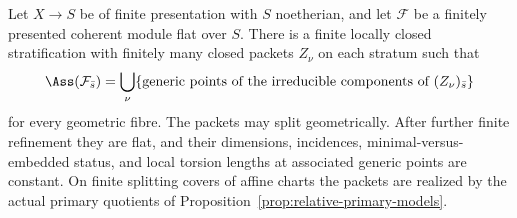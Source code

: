 

\begin{lemma}
\label{lem:finite-geometric-assassin-stratification}
Let \(X\to S\) be of finite presentation with \(S\) noetherian,
and let \(\mathcal F\) be a finitely presented coherent module flat
over \(S\).  There is a finite locally closed stratification with
finitely many closed packets \(Z_\nu\) on each stratum such that
\[
 \Ass(\mathcal F_{\bar s})
 =\bigcup_\nu\{\text{generic points of the irreducible components
 of }(Z_\nu)_{\bar s}\}
\]
for every geometric fibre.  The packets may split geometrically.
After further finite refinement they are flat, and their dimensions,
incidences, minimal-versus-embedded status, and local torsion lengths
at associated generic points are constant.  On finite splitting covers
of affine charts the packets are realized by the actual primary
quotients of Proposition~\ref{prop:relative-primary-models}.
\end{lemma}
